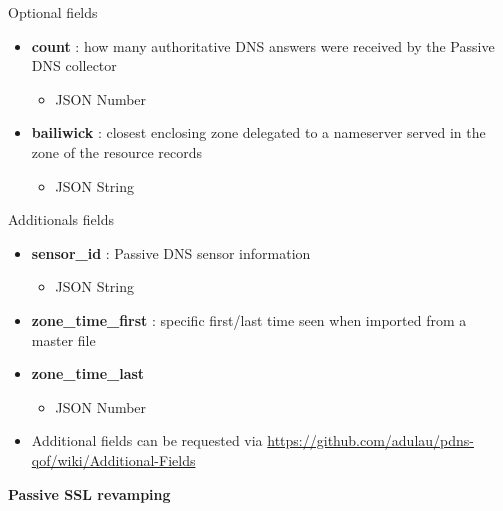 \documentclass{beamer}
\begin{document}
\begin{frame}[t]{Optional fields}
\begin{itemize}
\item \textbf{count} : how many authoritative DNS answers were received by the Passive DNS collector
\begin{itemize}
\item JSON Number
\end{itemize}
\item \textbf{bailiwick} : closest enclosing zone delegated to a nameserver served in the zone of the resource records
\begin{itemize}
\item JSON String
\end{itemize}

\end{itemize}
\end{frame}

\begin{frame}[t]{Additionals fields}
\begin{itemize}
\item \textbf{sensor\_id} : Passive DNS sensor information
\begin{itemize}
\item JSON String
\end{itemize}
\item \textbf{zone\_time\_first} : specific first/last time seen when imported from a master file
\item \textbf{zone\_time\_last}
\begin{itemize}
\item JSON Number
\end{itemize}
\item Additional fields can be requested via \url{https://github.com/adulau/pdns-qof/wiki/Additional-Fields}
\end{itemize}
\end{frame}


\begin{frame}
  \begin{center}
    {\bf Passive SSL revamping}
  \end{center}
\end{frame}
\end{document}
